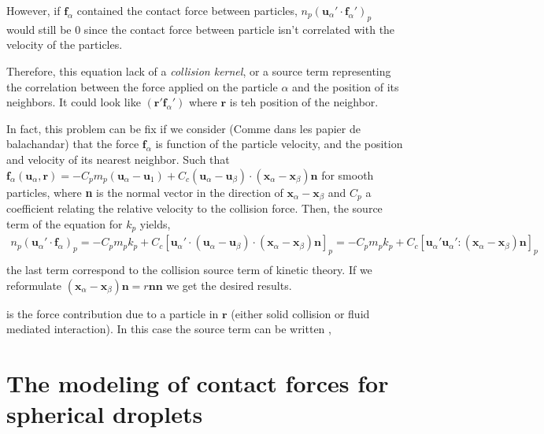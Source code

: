 However, if $\textbf{f}_\alpha$ contained the contact force between particles, $n_p (\textbf{u}_\alpha' \cdot \textbf{f}_\alpha')_p$ would still be $0$ since the contact force between particle isn't correlated with the velocity of the particles. 

Therefore, this equation lack of a  \textit{collision kernel}, or a source term representing the correlation between the force applied on the particle $\alpha$ and the position of its neighbors.
It could look like $(\textbf{r}' \textbf{f}_\alpha')$ where $\textbf{r}$ is teh position of the neighbor. 

In fact, this problem can be fix if we consider (Comme dans les papier de balachandar)
that the force $\textbf{f}_\alpha$ is function of the particle velocity, and the position and velocity of its nearest neighbor. 
Such that $\textbf{f}_\alpha(\textbf{u}_\alpha,\textbf{r})  = - C_p m_p  (\textbf{u}_\alpha - \textbf{u}_1) +  C_c(\textbf{u}_\alpha - \textbf{u}_\beta)\cdot(\textbf{x}_\alpha - \textbf{x}_\beta) \textbf{n}$ for smooth particles, where \textbf{n} is the normal vector in the direction of $\textbf{x}_\alpha - \textbf{x}_\beta$ and $C_p$ a coefficient relating the relative velocity to the collision force. 
Then, the source term of the equation for $k_p$ yields,
\begin{multline*}
    n_p (\textbf{u}_\alpha' \cdot \textbf{f}_\alpha)_p
    = - C_p m_p k_p
    +  C_c [\textbf{u}_\alpha' \cdot (\textbf{u}_\alpha - \textbf{u}_\beta)\cdot(\textbf{x}_\alpha - \textbf{x}_\beta) \textbf{n}]_p
    = - C_p m_p k_p
    +  C_c [\textbf{u}_\alpha'  \textbf{u}_\alpha' : (\textbf{x}_\alpha - \textbf{x}_\beta) \textbf{n}]_p
    \\
\end{multline*}
the last term correspond to the collision source term of kinetic theory. 
If we reformulate $(\textbf{x}_\alpha - \textbf{x}_\beta) \textbf{n} = r \textbf{n}\textbf{n}$ we get the desired results. 


is the force contribution due to a particle in $\textbf{r}$ (either solid collision or fluid mediated interaction). 
In this case the source term can be written ,
\section{The modeling of contact forces for spherical droplets}

